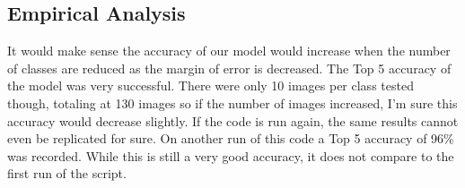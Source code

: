 \subsection*{Empirical Analysis}
It would make sense the accuracy of our model would increase when the number of classes are reduced as the margin of error is decreased.
The Top 5 accuracy of the model was very successful.
There were only 10 images per class tested though, totaling at 130 images so if the number of images increased, I'm sure this accuracy would decrease slightly.
If the code is run again, the same results cannot even be replicated for sure.
On another run of this code a Top 5 accuracy of 96\% was recorded.
While this is still a very good accuracy, it does not compare to the first run of the script.